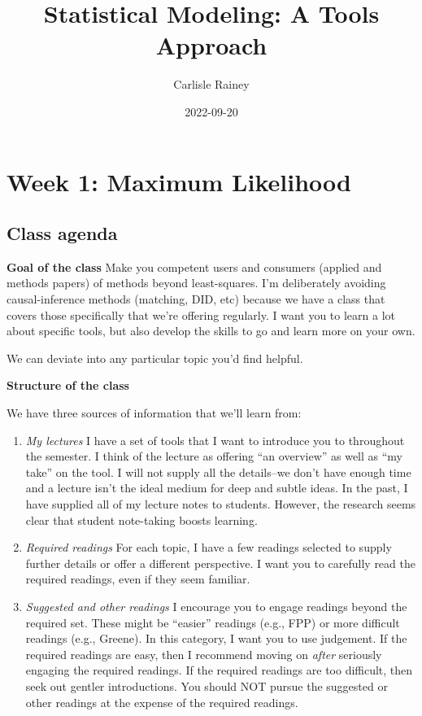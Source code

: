 \documentclass[
]{book}
\title{Statistical Modeling: A Tools Approach}
\author{Carlisle Rainey}
\date{2022-09-20}
\providecommand{\tightlist}{%
  \setlength{\itemsep}{0pt}\setlength{\parskip}{0pt}}
\begin{document}
\maketitle

{
\setcounter{tocdepth}{1}
\tableofcontents
}
\hypertarget{week-1-maximum-likelihood}{%
\chapter{Week 1: Maximum Likelihood}\label{week-1-maximum-likelihood}}

\hypertarget{class-agenda}{%
\section{Class agenda}\label{class-agenda}}

\textbf{Goal of the class} Make you competent users and consumers (applied and methods papers) of methods beyond least-squares. I'm deliberately avoiding causal-inference methods (matching, DID, etc) because we have a class that covers those specifically that we're offering regularly. I want you to learn a lot about specific tools, but also develop the skills to go and learn more on your own.

We can deviate into any particular topic you'd find helpful.

\textbf{Structure of the class}

We have three sources of information that we'll learn from:

\begin{enumerate}
\def\labelenumi{\arabic{enumi}.}
\tightlist
\item
  \emph{My lectures} I have a set of tools that I want to introduce you to throughout the semester. I think of the lecture as offering ``an overview'' as well as ``my take'' on the tool. I will not supply all the details--we don't have enough time and a lecture isn't the ideal medium for deep and subtle ideas. In the past, I have supplied all of my lecture notes to students. However, the research seems clear that student note-taking boosts learning.
\item
  \emph{Required readings} For each topic, I have a few readings selected to supply further details or offer a different perspective. I want you to carefully read the required readings, even if they seem familiar.
\item
  \emph{Suggested and other readings} I encourage you to engage readings beyond the required set. These might be ``easier'' readings (e.g., FPP) or more difficult readings (e.g., Greene). In this category, I want you to use judgement. If the required readings are easy, then I recommend moving on \emph{after} seriously engaging the required readings. If the required readings are too difficult, then seek out gentler introductions. You should NOT pursue the suggested or other readings at the expense of the required readings.
\end{enumerate}
\end{document}
